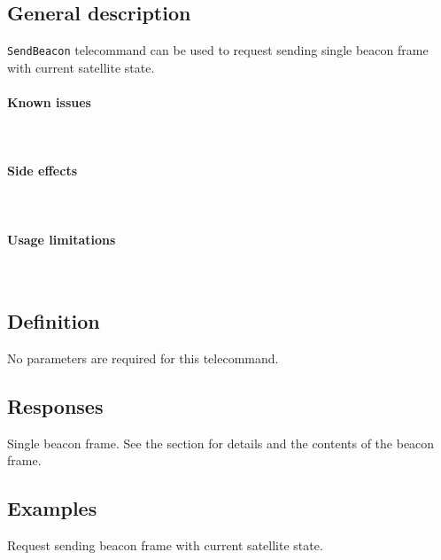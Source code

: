 

\subsection{General description}
\texttt{SendBeacon} telecommand can be used to request sending single beacon frame with current satellite state. 

\paragraph{Known issues} \mbox{} \\
\None

\paragraph{Side effects} \mbox{} \\
\None

\paragraph{Usage limitations} \mbox{} \\
\None

\subsection{Definition}

No parameters are required for this telecommand.

\subsection{Responses}
Single beacon frame. See the  section for details and the contents of the beacon frame.

\subsection{Examples}
Request sending beacon frame with current satellite state.

